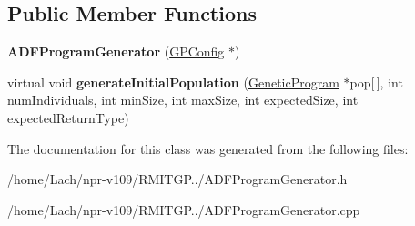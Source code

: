 \subsection*{Public Member Functions}
\begin{DoxyCompactItemize}
\item 
\hypertarget{classADFProgramGenerator_ae36a2f44de734a35861ce4480692902f}{}\label{classADFProgramGenerator_ae36a2f44de734a35861ce4480692902f} 
{\bfseries A\+D\+F\+Program\+Generator} (\hyperlink{classGPConfig}{G\+P\+Config} $\ast$)
\item 
\hypertarget{classADFProgramGenerator_ae5af12699c883fa26abc16861fae817d}{}\label{classADFProgramGenerator_ae5af12699c883fa26abc16861fae817d} 
virtual void {\bfseries generate\+Initial\+Population} (\hyperlink{classGeneticProgram}{Genetic\+Program} $\ast$pop\mbox{[}$\,$\mbox{]}, int num\+Individuals, int min\+Size, int max\+Size, int expected\+Size, int expected\+Return\+Type)
\end{DoxyCompactItemize}


The documentation for this class was generated from the following files\+:\begin{DoxyCompactItemize}
\item 
/home/\+Lach/npr-\/v109/\+R\+M\+I\+T\+G\+P../A\+D\+F\+Program\+Generator.\+h\item 
/home/\+Lach/npr-\/v109/\+R\+M\+I\+T\+G\+P../A\+D\+F\+Program\+Generator.\+cpp\end{DoxyCompactItemize}
